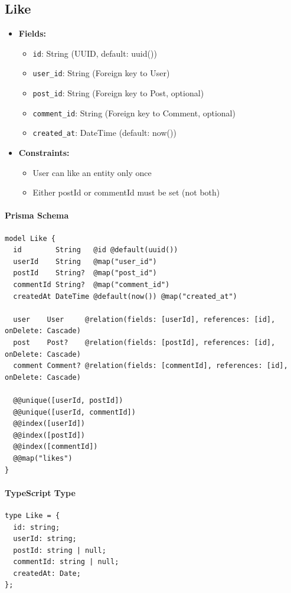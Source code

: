 \documentclass[11pt,a4paper]{article}
\begin{document}
\subsection{Like}
\begin{itemize}
    \item \textbf{Fields:}
    \begin{itemize}
        \item \texttt{id}: String (UUID, default: uuid())
        \item \texttt{user\_id}: String (Foreign key to User)
        \item \texttt{post\_id}: String (Foreign key to Post, optional)
        \item \texttt{comment\_id}: String (Foreign key to Comment, optional)
        \item \texttt{created\_at}: DateTime (default: now())
    \end{itemize}
    \item \textbf{Constraints:}
    \begin{itemize}
        \item User can like an entity only once
        \item Either postId or commentId must be set (not both)
    \end{itemize}
\end{itemize}

\paragraph{Prisma Schema}
\begin{lstlisting}
model Like {
  id        String   @id @default(uuid())
  userId    String   @map("user_id")
  postId    String?  @map("post_id")
  commentId String?  @map("comment_id")
  createdAt DateTime @default(now()) @map("created_at")
  
  user    User     @relation(fields: [userId], references: [id], onDelete: Cascade)
  post    Post?    @relation(fields: [postId], references: [id], onDelete: Cascade)
  comment Comment? @relation(fields: [commentId], references: [id], onDelete: Cascade)
  
  @@unique([userId, postId])
  @@unique([userId, commentId])
  @@index([userId])
  @@index([postId])
  @@index([commentId])
  @@map("likes")
}
\end{lstlisting}

\paragraph{TypeScript Type}
\begin{lstlisting}
type Like = {
  id: string;
  userId: string;
  postId: string | null;
  commentId: string | null;
  createdAt: Date;
};
\end{lstlisting}
\end{document}
